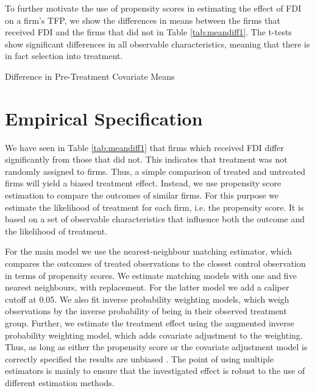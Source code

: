 \documentclass[a4paper,11pt]{scrartcl}
\begin{document}
To further motivate the use of propensity scores in estimating the effect of FDI on a firm's TFP, we show the differences in means between the firms that received FDI and the firms that did not in Table \ref{tab:meandiff1}. The t-tests show significant differences in all observable characteristics, meaning that there is in fact selection into treatment. %


\begin{table}[h!]
	\centering
	\caption{Difference in Pre-Treatment Covariate Means}
	\makebox[\textwidth]{
	}
	\label{tab:meandiff1}
\end{table}

\newpage
\section{Empirical Specification}


We have seen in Table \ref{tab:meandiff1} that firms which received FDI differ significantly from those that did not. This indicates that treatment was not randomly assigned to firms. %
Thus, a simple comparison of treated and untreated firms will yield a biased treatment effect. Instead, we use propensity score estimation to compare the outcomes of similar firms. For this purpose we estimate the  likelihood of treatment for each firm, i.e. the propensity score. It is based on a set of observable characteristics that influence both the outcome and the likelihood of treatment. 

For the main model we use the nearest-neighbour matching estimator, which compares the outcomes of treated observations to the closest control observation in terms of propensity scores. We estimate matching models  with one and five nearest neighbours, with replacement. For the latter model we add a caliper cutoff at 0.05. We also fit inverse probability weighting models, which weigh observations by the inverse probability of being in their observed treatment group. Further, we estimate the treatment effect using the augmented inverse probability weighting model, which adds covariate adjustment to the weighting. Thus, as long as either the propensity score or the covariate adjustment model is correctly specified the results are unbiased \citep[p.~393]{imbens2015}. The point of using multiple estimators is mainly to %
ensure that the investigated effect is robust to the use of different estimation methods.  
\end{document}
